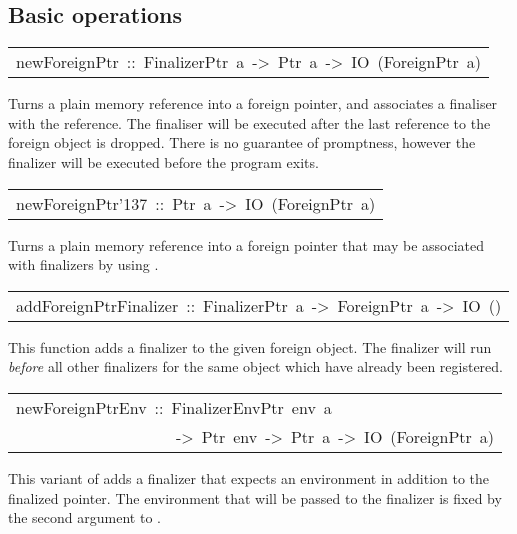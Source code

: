 \subsection{Basic operations
}
\begin{haddockdesc}
\item[\begin{tabular}{@{}l}
newForeignPtr\ ::\ FinalizerPtr\ a\ ->\ Ptr\ a\ ->\ IO\ (ForeignPtr\ a)
\end{tabular}]\haddockbegindoc
Turns a plain memory reference into a foreign pointer, and
 associates a finaliser with the reference.  The finaliser will be
 executed after the last reference to the foreign object is dropped.
 There is no guarantee of promptness, however the finalizer will be
 executed before the program exits.
\par

\end{haddockdesc}
\begin{haddockdesc}
\item[\begin{tabular}{@{}l}
newForeignPtr{\char '137}\ ::\ Ptr\ a\ ->\ IO\ (ForeignPtr\ a)
\end{tabular}]\haddockbegindoc
Turns a plain memory reference into a foreign pointer that may be
 associated with finalizers by using .
\par

\end{haddockdesc}
\begin{haddockdesc}
\item[\begin{tabular}{@{}l}
addForeignPtrFinalizer\ ::\ FinalizerPtr\ a\ ->\ ForeignPtr\ a\ ->\ IO\ ()
\end{tabular}]\haddockbegindoc
This function adds a finalizer to the given foreign object.  The
 finalizer will run \emph{before} all other finalizers for the same
 object which have already been registered.
\par

\end{haddockdesc}
\begin{haddockdesc}
\item[\begin{tabular}{@{}l}
newForeignPtrEnv\ ::\ FinalizerEnvPtr\ env\ a\\\ \ \ \ \ \ \ \ \ \ \ \ \ \ \ \ \ \ \ \ ->\ Ptr\ env\ ->\ Ptr\ a\ ->\ IO\ (ForeignPtr\ a)
\end{tabular}]\haddockbegindoc
This variant of  adds a finalizer that expects an
 environment in addition to the finalized pointer.  The environment
 that will be passed to the finalizer is fixed by the second argument to
 .
\par

\end{haddockdesc}
